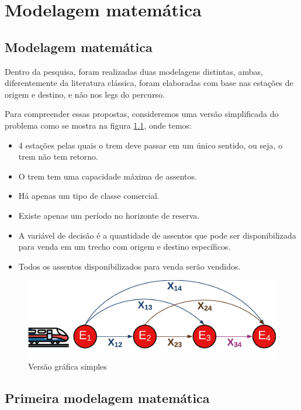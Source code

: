 \chapter{Modelagem matemática}

\section{Modelagem matemática}

Dentro da pesquisa, foram realizadas duas modelagens distintas, ambas, diferentemente da literatura clássica, foram elaboradas com base nas estações de origem e destino, e não nos legs do percurso.

Para compreender essas propostas, consideremos uma versão simplificada do problema como se mostra na figura \ref{fig: fig1}, onde temos:

\begin{itemize}
	\item 4 estações pelas quais o trem deve passar em um único sentido, ou seja, o trem não tem retorno.
	\item O trem tem uma capacidade máxima de assentos.
	\item Há apenas um tipo de classe comercial.
	\item Existe apenas um período no horizonte de reserva.
	\item A variável de decisão é a quantidade de assentos que pode ser disponibilizada para venda em um trecho com origem e destino específicos.
	\item Todos os assentos disponibilizados para venda serão vendidos.
\end{itemize}

\begin{figure}[th]
	\begin{center}
		\includegraphics[scale=0.18]{img/repre_ini1.png}
		\caption{Versão gráfica simples}
		\label{fig: fig1}
	\end{center}
\end{figure}


\section{Primeira modelagem matemática}\label{sec:modelo1}

